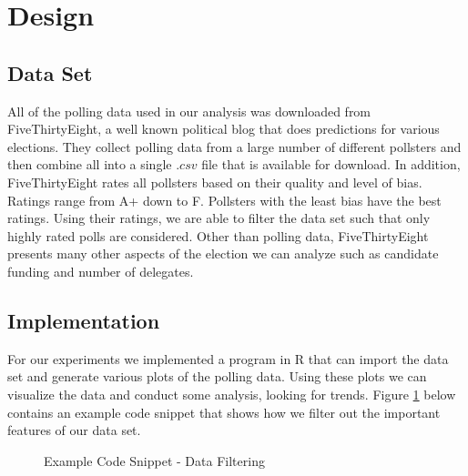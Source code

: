 \section{Design}\label{design}

\subsection{Data Set}

All of the polling data used in our analysis was downloaded from FiveThirtyEight, a well known political blog that does predictions for various elections. They collect polling data from a large number of different pollsters and then combine all into a single $.csv$ file that is available for download. In addition, FiveThirtyEight rates all pollsters based on their quality and level of bias. Ratings range from A+ down to F. Pollsters with the least bias have the best ratings. Using their ratings, we are able to filter the data set such that only highly rated polls are considered. Other than polling data, FiveThirtyEight presents many other aspects of the election we can analyze such as candidate funding and number of delegates.

\subsection{Implementation}

For our experiments we implemented a program in R that can import the data set and generate various plots of the polling data. Using these plots we can visualize the data and conduct some analysis, looking for trends. Figure \ref{code:filter} below contains an example code snippet that shows how we filter out the important features of our data set.

\begin{figure}[H]
\centering
{}
\caption{Example Code Snippet - Data Filtering}
\label{code:filter}
\end{figure}
